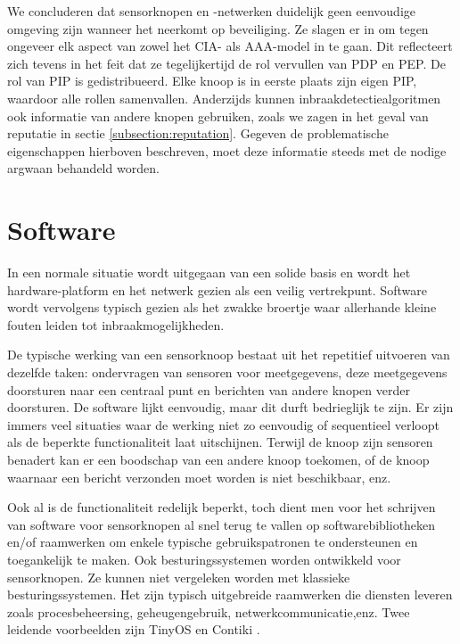 We concluderen dat sensorknopen en -netwerken duidelijk geen eenvoudige
omgeving zijn wanneer het neerkomt op beveiliging. Ze slagen er in om tegen
ongeveer elk aspect van zowel het CIA- als AAA-model in te gaan. Dit
reflecteert zich tevens in het feit dat ze tegelijkertijd de rol vervullen van
PDP en PEP. De rol van PIP is gedistribueerd. Elke knoop is in eerste plaats
zijn eigen PIP, waardoor alle rollen samenvallen. Anderzijds kunnen
inbraakdetectiealgoritmen ook informatie van andere knopen gebruiken, zoals we
zagen in het geval van reputatie in sectie \ref{subsection:reputation}. Gegeven
de problematische eigenschappen hierboven beschreven, moet deze informatie
steeds met de nodige argwaan behandeld worden.

\section{Software}
\label{section:problem-software}

In een normale situatie wordt uitgegaan van een solide basis en wordt het
hardware-platform en het netwerk gezien als een veilig vertrekpunt. Software
wordt vervolgens typisch gezien als het zwakke broertje waar allerhande kleine
fouten leiden tot inbraakmogelijkheden.

De typische werking van een sensorknoop bestaat uit het repetitief uitvoeren
van dezelfde taken: ondervragen van sensoren voor meetgegevens, deze
meetgegevens doorsturen naar een centraal punt en berichten van andere knopen
verder doorsturen. De software lijkt eenvoudig, maar dit durft bedrieglijk te
zijn. Er zijn immers veel situaties waar de werking niet zo eenvoudig of
sequentieel verloopt als de beperkte functionaliteit laat uitschijnen. Terwijl
de knoop zijn sensoren benadert kan er een boodschap van een andere knoop
toekomen, of de knoop waarnaar een bericht verzonden moet worden is niet
beschikbaar, enz.

Ook al is de functionaliteit redelijk beperkt, toch dient men voor het
schrijven van software voor sensorknopen al snel terug te vallen op
softwarebibliotheken en/of raamwerken om enkele typische gebruikspatronen te
ondersteunen en toegankelijk te maken. Ook besturingssystemen worden ontwikkeld
voor sensorknopen. Ze kunnen niet vergeleken worden met klassieke
besturingssystemen. Het zijn typisch uitgebreide raamwerken die diensten
leveren zoals procesbeheersing, geheugengebruik, netwerkcommunicatie,enz. Twee
leidende voorbeelden zijn TinyOS \citep{levis2005tinyos} en Contiki
\citep{dunkels2004contiki}.

